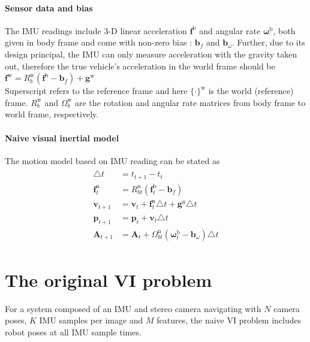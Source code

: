 \documentclass[12pt]{article}   %
\begin{document}
\paragraph{Sensor data and bias}
The IMU readings include 3-D linear acceleration $\bm{f}^{\mathrm{b}}$ and angular rate $\bm{\omega}^{\mathrm{b}}$, both given in body frame and come with non-zero bias : $\bm{b}_f$ and $\bm{b}_\omega$. \newline
Further, due to its design principal, the IMU can only measure acceleration with the gravity taken out, therefore the true vehicle's acceleration in the world frame should be \\
$\bm{f}^{\mathrm{w}} = R_b^{\mathrm{w}}( \bm{f}^{\mathrm{b}}-\bm{b}_f ) + \bm{g}^{\mathrm{w}}$ \\
Superscript refers to the reference frame and here $\{\cdot\}^{\mathrm{w}}$ is the world (reference) frame.
$R_b^{\mathrm{w}}$ and $\Omega_b^{\mathrm{w}}$ are the rotation and angular rate matrices from body frame to world frame, respectively.


\paragraph{Naive visual inertial model}

The motion model based on IMU reading can be stated as
\begin{align}
\begin{split}
	\triangle t & =  t_{t+1} - t_t \\
	\bm{f}_t^{\mathrm{n}} & = R_{bt}^{\mathrm{n}}  (\bm{f}_t^{\mathrm{b}} - \bm{b}_f) \\
	\bm{v}_{t+1} & = \bm{v}_{t} + \bm{f}_t^{\mathrm{n}} \triangle t + \bm{g}^{\mathrm{n}} \triangle t \\
	\bm{p}_{t+1} & = \bm{p}_{t} + \bm{v}_t \triangle t \\
	\bm{A}_{t+1} & = \bm{A}_t + \Omega_{bt}^{\mathrm{n}}  (\bm{\omega}_t^{\mathrm{b}} - \bm{b}_\omega) \triangle t
\end{split}
\end{align}

\section{The original VI problem}
For a system composed of an IMU and stereo camera navigating with $N$ camera poses, $K$ IMU samples per image and $M$ features, the naive VI problem includes robot poses at all IMU sample times.
\end{document}
